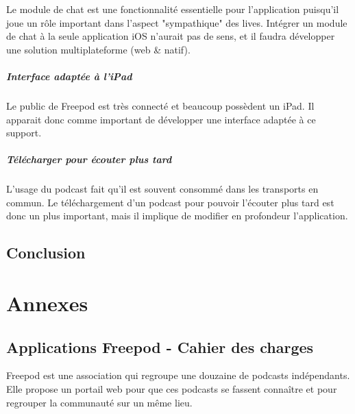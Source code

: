 \documentclass[11pt, french]{report}
\begin{document}
Le module de chat est une fonctionnalité essentielle pour l'application puisqu'il joue un rôle important dans l'aspect "sympathique" des lives. Intégrer un module de chat à la seule application iOS n'aurait pas de sens, et il faudra développer une solution multiplateforme (web \& natif).

\subsubsection{Interface adaptée à l'iPad}

Le public de Freepod est très connecté et beaucoup possèdent un iPad. Il apparait donc comme important de développer une interface adaptée à ce support.

\subsubsection{Télécharger pour écouter plus tard}

L'usage du podcast fait qu'il est souvent consommé dans les transports en commun. Le téléchargement d'un podcast pour pouvoir l'écouter plus tard est donc un plus important, mais il implique de modifier en profondeur l'application.


\chapter*{Conclusion}



 

\part*{Annexes}

\appendix

\chapter{Applications Freepod - Cahier des charges}

Freepod est une association qui regroupe une douzaine de podcasts indépendants. Elle propose un portail web pour que ces podcasts se fassent connaître et pour regrouper la communauté sur un même lieu.
\end{document}
